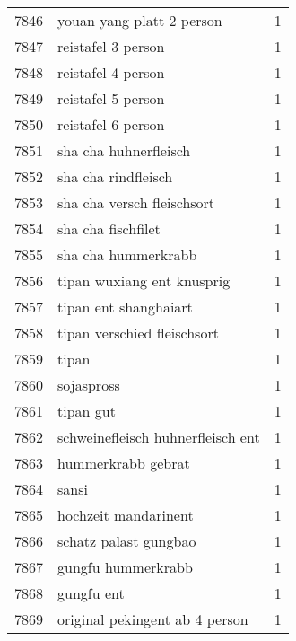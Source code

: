 \begin{tabular}{llr}
7846 &                          youan yang platt 2 person &      1 \\
7847 &                                 reistafel 3 person &      1 \\
7848 &                                 reistafel 4 person &      1 \\
7849 &                                 reistafel 5 person &      1 \\
7850 &                                 reistafel 6 person &      1 \\
7851 &                              sha cha huhnerfleisch &      1 \\
7852 &                                sha cha rindfleisch &      1 \\
7853 &                         sha cha versch fleischsort &      1 \\
7854 &                                 sha cha fischfilet &      1 \\
7855 &                                sha cha hummerkrabb &      1 \\
7856 &                         tipan wuxiang ent knusprig &      1 \\
7857 &                              tipan ent shanghaiart &      1 \\
7858 &                        tipan verschied fleischsort &      1 \\
7859 &                                              tipan &      1 \\
7860 &                                         sojaspross &      1 \\
7861 &                                          tipan gut &      1 \\
7862 &                  schweinefleisch huhnerfleisch ent &      1 \\
7863 &                                 hummerkrabb gebrat &      1 \\
7864 &                                              sansi &      1 \\
7865 &                               hochzeit mandarinent &      1 \\
7866 &                              schatz palast gungbao &      1 \\
7867 &                                 gungfu hummerkrabb &      1 \\
7868 &                                         gungfu ent &      1 \\
7869 &                     original pekingent ab 4 person &      1 \\

\end{tabular}
